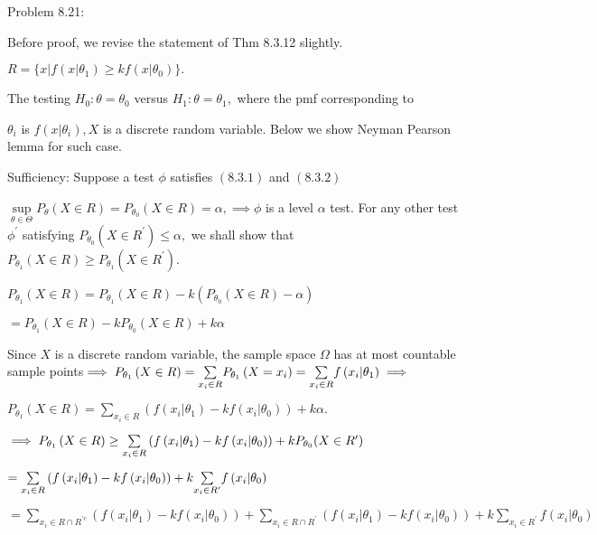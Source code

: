 \documentclass{article}
\begin{document}
Problem 8.21:

Before proof, we revise the statement of Thm 8.3.12 slightly.

$R=\{x|f\left( x|\theta _{1}\right) \geq kf\left( x|\theta _{0}\right) \}.$

The testing $H_{0}:\theta =\theta _{0}$ versus $H_{1}:\theta =\theta _{1},$%
where the pmf corresponding to

$\theta _{i}$ is $f\left( x|\theta _{i}\right) ,X$ is a discrete random
variable. Below we show Neyman Pearson lemma for such case.

\bigskip Sufficiency: Suppose a test $\phi $ satisfies $\left( 8.3.1\right) $
and $\left( 8.3.2\right) $

$\underset{\theta \in \Theta }{\sup }P_{\theta }\left( X\in R\right)
=P_{\theta _{0}}\left( X\in R\right) =\alpha ,\implies \phi $ is a level $%
\alpha $ test. For any other test $\phi ^{\prime }$ satisfying $P_{\theta
_{0}}(X\in R^{\prime })\leq \alpha ,$ we shall show that $P_{\theta
_{1}}\left( X\in R\right) \geq P_{\theta _{1}}\left( X\in R^{\prime }\right)
.$

$P_{\theta _{1}}\left( X\in R\right) =P_{\theta _{1}}\left( X\in R\right)
-k\left( P_{\theta _{0}}\left( X\in R\right) -\alpha \right) $

$=P_{\theta _{1}}\left( X\in R\right) -kP_{\theta _{0}}\left( X\in R\right)
+k\alpha $

Since $X$ is a discrete random variable, the sample space $\Omega $ has at
most countable sample points$\implies P_{\theta _{1}}\left( X\in R\right) =%
\underset{x_{i}\in R}{\sum }P_{\theta _{1}}\left( X=x_{i}\right) =\underset{%
x_{i}\in R}{\sum }f\left( x_{i}|\theta _{1}\right) \implies $

$P_{\theta _{1}}\left( X\in R\right) =\underset{x_{i}\in R}{\sum }\left(
f\left( x_{i}|\theta _{1}\right) -kf\left( x_{i}|\theta _{0}\right) \right)
+k\alpha .$

$\implies P_{\theta _{1}}\left( X\in R\right) \geq \underset{x_{i}\in R}{%
\sum }\left( f\left( x_{i}|\theta _{1}\right) -kf\left( x_{i}|\theta
_{0}\right) \right) +kP_{\theta _{0}}(X\in R^{\prime })$

$=\underset{x_{i}\in R}{\sum }\left( f\left( x_{i}|\theta _{1}\right)
-kf\left( x_{i}|\theta _{0}\right) \right) +k\underset{x_{i}\in R^{\prime }}{%
\sum }f\left( x_{i}|\theta _{0}\right) $

$=\underset{x_{i}\in R\cap R^{\prime c}}{\sum }\left( f\left( x_{i}|\theta
_{1}\right) -kf\left( x_{i}|\theta _{0}\right) \right) +\underset{x_{i}\in
R\cap R^{\prime }}{\sum }\left( f\left( x_{i}|\theta _{1}\right) -kf\left(
x_{i}|\theta _{0}\right) \right) +k\underset{x_{i}\in R^{\prime }}{\sum }%
f\left( x_{i}|\theta _{0}\right) $
\end{document}
